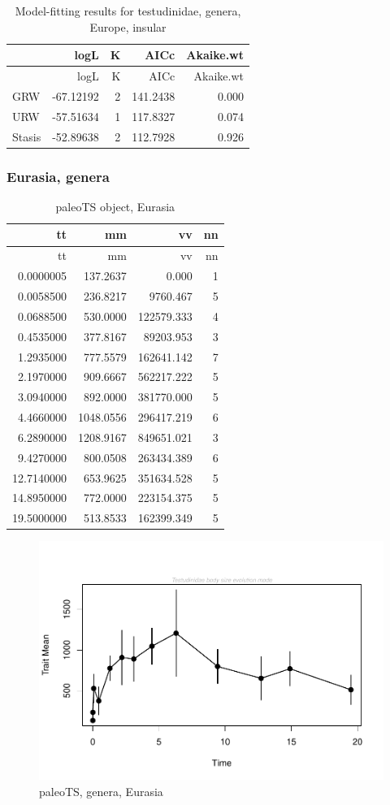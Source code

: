 \begin{longtable}[]{@{}lrrrr@{}}
	\caption{Model-fitting results for testudinidae, genera, Europe,
		insular}
	\label{tab:pTSEuIEM}\tabularnewline
	\toprule
	& logL & K & AICc & Akaike.wt\tabularnewline
	\midrule
	\endfirsthead
	\toprule
	& logL & K & AICc & Akaike.wt\tabularnewline
	\midrule
	\endhead
	GRW & -67.12192 & 2 & 141.2438 & 0.000\tabularnewline
	URW & -57.51634 & 1 & 117.8327 & 0.074\tabularnewline
	Stasis & -52.89638 & 2 & 112.7928 & 0.926\tabularnewline
	\bottomrule
\end{longtable}


\FloatBarrier
\subsubsection{Eurasia,	genera}\label{eurasia-genera}

\begin{longtable}[]{@{}rrrr@{}}
	\caption{paleoTS object, Eurasia}
	\label{tab:pTSEs}\tabularnewline
	\toprule
	tt & mm & vv & nn\tabularnewline
	\midrule
	\endfirsthead
	\toprule
	tt & mm & vv & nn\tabularnewline
	\midrule
	\endhead
	0.0000005 & 137.2637 & 0.000 & 1\tabularnewline
	0.0058500 & 236.8217 & 9760.467 & 5\tabularnewline
	0.0688500 & 530.0000 & 122579.333 & 4\tabularnewline
	0.4535000 & 377.8167 & 89203.953 & 3\tabularnewline
	1.2935000 & 777.5579 & 162641.142 & 7\tabularnewline
	2.1970000 & 909.6667 & 562217.222 & 5\tabularnewline
	3.0940000 & 892.0000 & 381770.000 & 5\tabularnewline
	4.4660000 & 1048.0556 & 296417.219 & 6\tabularnewline
	6.2890000 & 1208.9167 & 849651.021 & 3\tabularnewline
	9.4270000 & 800.0508 & 263434.389 & 6\tabularnewline
	12.7140000 & 653.9625 & 351634.528 & 5\tabularnewline
	14.8950000 & 772.0000 & 223154.375 & 5\tabularnewline
	19.5000000 & 513.8533 & 162399.349 & 5\tabularnewline
	\bottomrule
\end{longtable}

\begin{figure}[htbp]
	\centering
	\includegraphics{MA_JJ_files/figure-latex/paleoTSEurasia-1.pdf}
	\caption{paleoTS, genera, Eurasia}
	\label{fig:pTSEs}
\end{figure}

